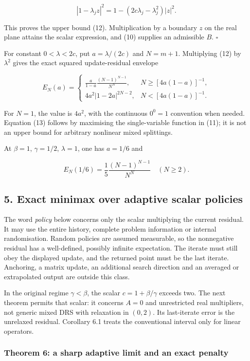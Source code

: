 \documentclass[
  british,
  11pt,
  a4paper,
]{article}
\let\oldsubsection\subsection
\renewcommand{\subsection}{\Needspace{5\baselineskip}\oldsubsection}
\begin{document}
\[|1-\lambda_jz|^2=1-(2c\lambda_j-\lambda_j^2)|z|^2.\]

This proves the upper bound (12). Multiplication by a boundary \(z\) on
the real plane attains the scalar expression, and (10) supplies an
admissible \(B\). \(\square\)

For constant \(0<\lambda<2c\), put \(a=\lambda/(2c)\) and \(N=m+1\).
Multiplying (12) by \(\lambda^2\) gives the exact squared
update-residual envelope

\[
E_N(a)=
\begin{cases}
\displaystyle\frac{a}{1-a}\frac{(N-1)^{N-1}}{N^N},
&N\geq[4a(1-a)]^{-1},\\[6pt]
\displaystyle4a^2|1-2a|^{2N-2},
&N<[4a(1-a)]^{-1}.
\end{cases}
\tag{13}
\]

For \(N=1\), the value is \(4a^2\), with the continuous \(0^0=1\)
convention when needed. Equation (13) follows by maximising the
single-variable function in (11); it is not an upper bound for arbitrary
nonlinear mixed splittings.

At \(\beta=1\), \(\gamma=1/2\), \(\lambda=1\), one has \(a=1/6\) and

\[E_N(1/6)=\frac15\frac{(N-1)^{N-1}}{N^N}\quad(N\geq2).\]

\subsection{5. Exact minimax over adaptive scalar
policies}\label{exact-minimax-over-adaptive-scalar-policies}

The word \emph{policy} below concerns only the scalar multiplying the
current residual. It may use the entire history, complete problem
information or internal randomisation. Random policies are assumed
measurable, so the nonnegative residual has a well-defined, possibly
infinite expectation. The iterate must still obey the displayed update,
and the returned point must be the last iterate. Anchoring, a matrix
update, an additional search direction and an averaged or extrapolated
output are outside this class.

In the original regime \(\gamma<\beta\), the scalar \(c=1+\beta/\gamma\)
exceeds two. The next theorem permits that scalar: it concerns \(A=0\)
and unrestricted real multipliers, not generic mixed DRS with relaxation
in \((0,2)\). Its last-iterate error is the unrelaxed residual.
Corollary 6.1 treats the conventional interval only for linear
operators.

\subsubsection{Theorem 6: a sharp adaptive limit and an exact
penalty}\label{theorem-6-a-sharp-adaptive-limit-and-an-exact-penalty}
\end{document}
